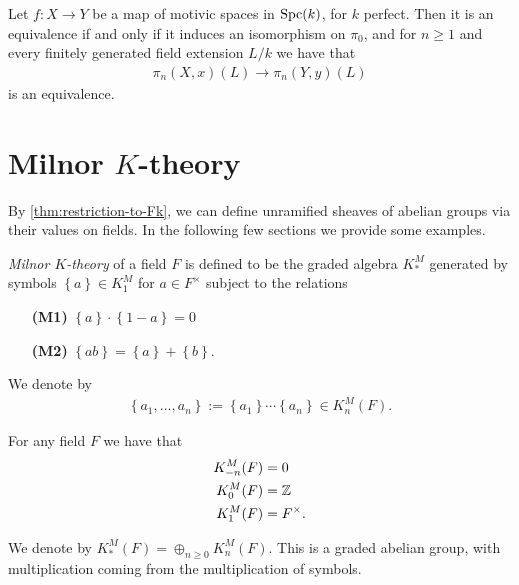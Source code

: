 \documentclass[11pt,openany]{book}
\begin{document}
\begin{corollary} Let $f \colon X \to Y$ be a map of motivic spaces in $\mathrm{Spc}(k)$, for $k$ perfect. Then it is an equivalence if and only if it induces an isomorphism on $\pi_0$, and for $n\ge 1$ and every finitely generated field extension $L/k$ we have that
\begin{align*}
    \pi_n(X,x)(L) \to \pi_n(Y,y)(L)
\end{align*}
is an equivalence.
\end{corollary}


\section{Milnor $K$-theory}

By \autoref{thm:restriction-to-Fk}, we can define unramified sheaves of abelian groups via their values on fields. In the following few sections we provide some examples.

\begin{definition} \textit{Milnor $K$-theory} of a field $F$ is defined to be the graded algebra $K_\ast^M$ generated by symbols $\left\{ a \right\}\in K_1^M$ for $a\in F^\times$ subject to the relations
\begin{enumerate}
    \item[\textbf{(M1)}] $\left\{ a \right\}\cdot \left\{ 1-a \right\} = 0$
    \item[\textbf{(M2)}] $\left\{ ab \right\} = \left\{ a \right\} + \left\{ b \right\}$.
\end{enumerate}
\end{definition}

\begin{notation} We denote by
\begin{align*}
    \left\{ a_1, \ldots, a_n \right\} := \left\{ a_1 \right\} \cdots \left\{ a_n \right\}\in K_n^M(F).
\end{align*}
\end{notation}

\begin{proposition} For any field $F$ we have that
\begin{align*}
    K^M_{-n}(F) &= 0 \\
    K^M_0(F) &= \mathbb{Z} \\
    K^M_{1}(F) &= F^\times.
\end{align*}
\end{proposition}

\begin{notation} We denote by $K_\ast^M(F) = \oplus_{n\ge0} K_n^M(F)$. This is a graded abelian group, with multiplication coming from the multiplication of symbols.
\end{notation}
\end{document}
